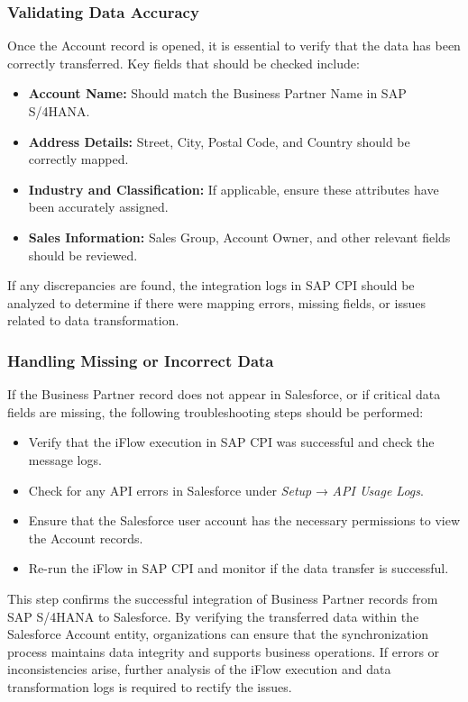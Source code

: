 \subsubsection{Validating Data Accuracy}
Once the Account record is opened, it is essential to verify that the data has been correctly transferred. Key fields that should be checked include:

\begin{itemize}
    \item \textbf{Account Name:} Should match the Business Partner Name in SAP S/4HANA.
    \item \textbf{Address Details:} Street, City, Postal Code, and Country should be correctly mapped.
    \item \textbf{Industry and Classification:} If applicable, ensure these attributes have been accurately assigned.
    \item \textbf{Sales Information:} Sales Group, Account Owner, and other relevant fields should be reviewed.
\end{itemize}

If any discrepancies are found, the integration logs in SAP CPI should be analyzed to determine if there were mapping errors, missing fields, or issues related to data transformation.

\subsubsection{Handling Missing or Incorrect Data}
If the Business Partner record does not appear in Salesforce, or if critical data fields are missing, the following troubleshooting steps should be performed:

\begin{itemize}
    \item Verify that the iFlow execution in SAP CPI was successful and check the message logs.
    \item Check for any API errors in Salesforce under \textit{Setup} → \textit{API Usage Logs}.
    \item Ensure that the Salesforce user account has the necessary permissions to view the Account records.
    \item Re-run the iFlow in SAP CPI and monitor if the data transfer is successful.
\end{itemize}

This step confirms the successful integration of Business Partner records from SAP S/4HANA to Salesforce. By verifying the transferred data within the Salesforce Account entity, organizations can ensure that the synchronization process maintains data integrity and supports business operations. If errors or inconsistencies arise, further analysis of the iFlow execution and data transformation logs is required to rectify the issues.



